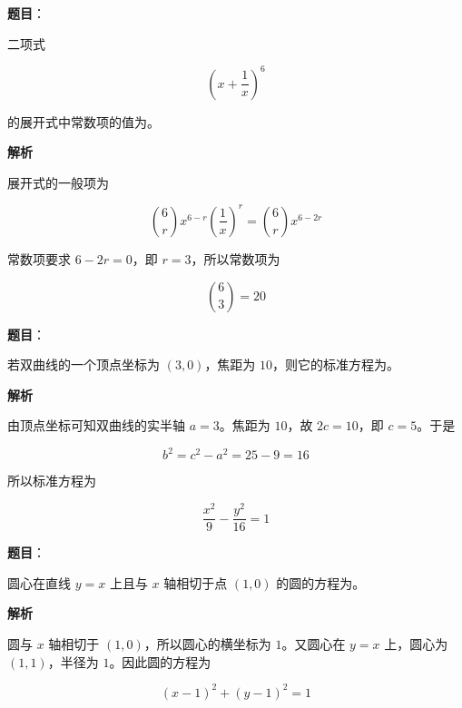 \begin{answer}

\textbf{题目}：

二项式

\nopagebreak[4]
\[
\left(x+\dfrac1x\right)^6
\]

的展开式中常数项的值为\gkblank{}。

\textbf{解析}

展开式的一般项为

\nopagebreak[4]
\[
\binom6r x^{6-r}\left(\frac1x\right)^r
=\binom6r x^{6-2r}
\]

常数项要求 $6-2r=0$，即 $r=3$，所以常数项为

\nopagebreak[4]
\[
\binom63=20
\]


\end{answer}
\begin{answer}

\textbf{题目}：

若双曲线的一个顶点坐标为 $(3,0)$，焦距为 $10$，则它的标准方程为\gkblank{}。

\textbf{解析}

由顶点坐标可知双曲线的实半轴 $a=3$。焦距为 $10$，故 $2c=10$，即 $c=5$。于是

\nopagebreak[4]
\[
b^2=c^2-a^2=25-9=16
\]

所以标准方程为

\nopagebreak[4]
\[
\frac{x^2}{9}-\frac{y^2}{16}=1
\]


\end{answer}
\begin{answer}

\textbf{题目}：

圆心在直线 $y=x$ 上且与 $x$ 轴相切于点 $(1,0)$ 的圆的方程为\gkblank{}。

\textbf{解析}

圆与 $x$ 轴相切于 $(1,0)$，所以圆心的横坐标为 $1$。又圆心在 $y=x$ 上，圆心为 $(1,1)$，半径为 $1$。因此圆的方程为

\nopagebreak[4]
\[
(x-1)^2+(y-1)^2=1
\]


\end{answer}
